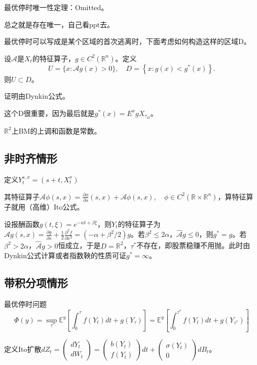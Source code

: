 最优停时唯一性定理：Omitted。

总之就是存在唯一，自己看ppt去。

最优停时可以写成是某个区域的首次逃离时，下面考虑如何构造这样的区域D。

设$\mathcal{A}$是$X_{t}$的特征算子，$g \in C^{2}\left(\mathbb{R}^{n}\right)$。定义
\[
  U=\{x: \mathcal{A} g(x)>0\}, \quad D=\left\{x: g(x)<g^{*}(x)\right\} .
\]
则$U \subset D$。

证明由Dynkin公式。

这个D很重要，因为最后就是$g^{\ast}(x) = E^x g{X_{\tau_D}}$。

$\mathbb{R}^2$上BM的上调和函数是常数。

\subsection{非时齐情形}

定义$Y_{t}^{s, x}=\left(s+t, X_{t}^{x}\right)$

其特征算子$\hat{\mathcal{A}} \phi(s, x)=\frac{\partial \phi}{\partial s}(s, x)+\mathcal{A} \phi(s, x), \quad \phi \in C^{2}\left(\mathbb{R} \times \mathbb{R}^{n}\right)$，算特征算子就用（高维）Ito公式。

设报酬函数$g(t, \xi)=e^{-\alpha t+\beta \xi}$，则$Y_t$的特征算子为$\hat{\mathcal{A}} g(s, x)=\frac{\partial g}{\partial s}+\frac{1}{2} \frac{\partial^{2} f}{\partial x^{2}}=\left(-\alpha+\beta^{2} / 2\right) g$。若$\beta^{2} \leq 2 \alpha$，$\hat{\mathcal{A}} g \leq 0$，则$g^{\ast} = g$。若$\beta^{2} > 2 \alpha$，$\hat{\mathcal{A}} g > 0$恒成立，于是$D = \mathbb{R}^2$，$\tau^{\ast}$不存在，即股票稳赚不用抛。此时由Dynkin公式计算或者指数鞅的性质可证$g^{\ast} = \infty$。

\subsection{带积分项情形}

最优停时问题
\[
  \Phi(y)=\sup _{\tau} \mathbb{E}^{y}\left[\int_{0}^{\tau} f\left(Y_{t}\right) d t+g\left(Y_{\tau}\right)\right]=\mathbb{E}^{y}\left[\int_{0}^{\tau^{*}} f\left(Y_{t}\right) d t+g\left(Y_{\tau^{*}}\right)\right]
\]

定义Ito扩散$d Z_{t}=\left(\begin{array}{c}
  d Y_{t} \\
  d W_{t}
\end{array}\right)=\left(\begin{array}{l}
  b\left(Y_{t}\right) \\
  f\left(Y_{t}\right)
\end{array}\right) d t+\left(\begin{array}{l}
  \sigma\left(Y_{t}\right) \\
  0
\end{array}\right) d B_{t}$。

